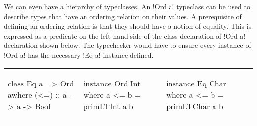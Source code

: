 \documentclass[format=acmsmall,manuscript,review,screen,nonacm,margin=1in,11pt]{acmart}
\begin{document}
We can even have a hierarchy of typeclasses. An !Ord a! typeclass can be used to describe
types that have an ordering relation on their values. A prerequisite of defining an ordering relation
is that they should have a notion of equality. This is expressed as a predicate on the left hand side
of the class declaration of !Ord a! declaration shown below. The typechecker would
have to ensure every instance of !Ord a! has the necessary !Eq a! instance defined.\newline
{    \footnotesize
  \begin{tabular}{l l l}
\begin{code}
class Eq a => Ord awhere
  (<=) :: a -> a -> Bool
\end{code}&%
\begin{code}
instance Ord Int where
  a <= b = primLTInt a b
\end{code}&%
\begin{code}
instance Eq Char where
  a <= b = primLTChar a b
\end{code}
\end{tabular}}
\end{document}
